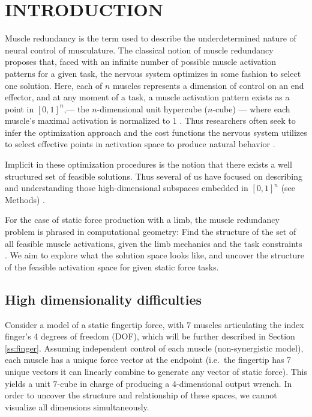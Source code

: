 
\section{INTRODUCTION}

Muscle redundancy is the term used to describe the underdetermined nature of neural control of musculature.
The classical notion of muscle redundancy  proposes that, faced with an infinite number of possible muscle activation patterns for a given task, the nervous system optimizes in some fashion to select one solution.
Here, each of $n$ muscles represents a dimension of control on an end effector, and at any moment of a task, a muscle activation pattern exists as a point in $[0,1]^n$,--- the $n$-dimensional unit hypercube ($n$-cube) --- where each muscle's maximal activation is normalized to $1$ \cite{Valero-Cuevas1998Large}.
Thus researchers often seek to infer the optimization approach and the cost functions the nervous system utilizes to select effective points in activation space to produce natural behavior \cite{Chao1978Graphical,Prilutsky2000Muscle,scott2004optimal,todorov2002optimal,crowninshield1981physiologically,higginson2005simulated}. 

Implicit in these optimization procedures is the notion that there exists a well structured set of feasible solutions. Thus several of us have focused on describing and understanding those high-dimensional subspaces  embedded in $[0,1]^n$ (see Methods) \cite{kutch2011muscle,kutch2012challenges,sohn2013cat_bounding_box,Valero-Cuevas1998Large,Valero-Cuevas2015high-dimensional}.

For the case of static force production with a limb, the muscle redundancy problem is phrased in computational geometry: Find the structure of the set of all feasible muscle activations, given the limb mechanics and the task constraints \cite{avis1992Pivoting,Valero-Cuevas1998Large,Valero-Cuevas2009mathematical,Valero-Cuevas2015high-dimensional}.
We aim to explore what the solution space looks like, and uncover the structure of the feasible activation space for given static force tasks.

\subsection{High dimensionality difficulties}
Consider a model of a static fingertip force, with 7 muscles articulating the index finger's 4 degrees of freedom (DOF), which will be further described in Section \ref{ss:finger}.
Assuming independent control of each muscle (non-synergistic model), each muscle has a unique force vector at the endpoint (i.e.\ the fingertip has 7 unique vectors it can linearly combine to generate any vector of static force).
This yields a unit $7$-cube in charge of producing a 4-dimensional output wrench.
In order to uncover the structure and relationship of these spaces, we cannot visualize all dimensions simultaneously. %

